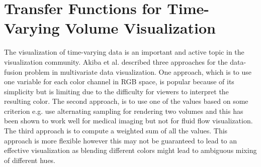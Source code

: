 \documentclass{egpubl}
\begin{document}
\section{Transfer Functions for Time-Varying Volume Visualization}
The visualization of time-varying data is an important and active topic in the visualization community. 
Akiba et al. \cite{akiba_visualizing_2007} described three approaches for the data-fusion problem in multivariate data visualization.
One approach, which is to use one variable for each color channel in RGB space, is popular because of its simplicity but is limiting due to the difficulty for viewers to interpret the resulting color.
The second approach, is to use one of the values based on some criterion e.g. \cite{hastreiter_integrated_1998}
use alternating sampling for rendering two volumes and this has been shown to work well for medical imaging but not for fluid flow visualization.
The third approach is to compute a weighted sum of all the values. This approach is more flexible however this may not be guaranteed to lead to an effective visualization as blending different colors might lead to ambiguous mixing of different hues.
\end{document}
